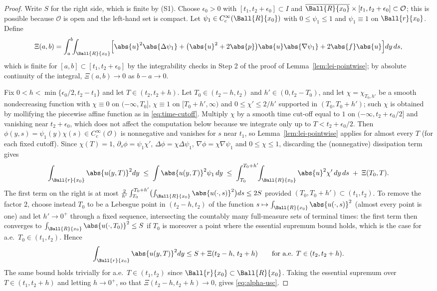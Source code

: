 \documentclass[11pt,reqno]{amsart}
\begin{document}
\begin{proof}
Write $S$ for the right side, which is finite by (S1). Choose
$\epsilon_{0}>0$ with $[t_{1},t_{2}+\epsilon_{0}]\subset I$ and
$\overline{\Ball{R}{x_{0}}}\times[t_{1},t_{2}+\epsilon_{0}]\subset\mathcal{O}$;
this is possible because $\mathcal{O}$ is open and the left-hand set is compact.
Let $\psi_{1}\in C_{c}^{\infty}(\Ball{R}{x_{0}})$ with $0\le\psi_{1}\le1$ and
$\psi_{1}\equiv1$ on $\Ball{r}{x_{0}}$. Define
\[
  \Xi(a,b)=\int_{a}^{b}\!\!\int_{\Ball{R}{x_{0}}}
   \Bigl[\abs{u}^{2}\abs{\Delta\psi_{1}}
    +\bigl(\abs{u}^{2}+2\abs{p}\bigr)\abs{u}\abs{\nabla\psi_{1}}
    +2\abs{f}\abs{u}\Bigr]dy\,ds ,
\]
which is finite for $[a,b]\subset[t_{1},t_{2}+\epsilon_{0}]$ by the
integrability checks in Step 2 of the proof of Lemma~\ref{lem:lei-pointwise};
by absolute continuity of the integral, $\Xi(a,b)\to0$ as $b-a\to0$.

Fix $0<h<\min\{\epsilon_{0}/2,t_2-t_1\}$ and let $T\in(t_{2},t_{2}+h)$. Let
$T_{0}\in(t_{2}-h,t_{2})$ and $h'\in(0,t_{2}-T_{0})$, and let
$\chi=\chi_{T_{0},h'}$ be a smooth nondecreasing function with $\chi\equiv0$ on
$(-\infty,T_{0}]$, $\chi\equiv1$ on $[T_{0}+h',\infty)$ and
$0\le\chi'\le2/h'$ supported in $(T_{0},T_{0}+h')$; such $\chi$ is obtained by
mollifying the piecewise affine function as in \eqref{eq:time-cutoff}. Multiply
$\chi$ by a smooth time cut-off equal to $1$ on
$(-\infty,t_{2}+\epsilon_{0}/2]$ and vanishing near $t_{2}+\epsilon_{0}$, which
does not affect the computation below because we integrate only up to
$T<t_{2}+\epsilon_{0}/2$. Then
$\phi(y,s)=\psi_{1}(y)\chi(s)\in C_{c}^{\infty}(\mathcal{O})$ is nonnegative and
vanishes for $s$ near $t_{1}$, so Lemma~\ref{lem:lei-pointwise} applies for almost every
$T$ (for each fixed cutoff). Since $\chi(T)=1$, $\partial_{s}\phi=\psi_{1}\chi'$,
$\Delta\phi=\chi\Delta\psi_{1}$, $\nabla\phi=\chi\nabla\psi_{1}$ and
$0\le\chi\le1$, discarding the (nonnegative) dissipation term gives
\[
  \int_{\Ball{r}{x_{0}}}\abs{u(y,T)}^{2}dy
  \;\le\;\int\abs{u(y,T)}^{2}\psi_{1}\,dy
  \;\le\;\int_{T_{0}}^{T_{0}+h'}\!\!\int_{\Ball{R}{x_{0}}}\abs{u}^{2}\chi'\,dy\,ds
   \;+\;\Xi(T_{0},T).
\]
The first term on the right is at most
$\frac{2}{h'}\int_{T_{0}}^{T_{0}+h'}\bigl(\int_{\Ball{R}{x_{0}}}\abs{u(\cdot,s)}^{2}\bigr)ds
 \le2S$ provided $(T_{0},T_{0}+h')\subset(t_{1},t_{2})$. To remove the factor
$2$, choose instead $T_{0}$ to be a Lebesgue point in $(t_{2}-h,t_{2})$ of the
function $s\mapsto\int_{\Ball{R}{x_{0}}}\abs{u(\cdot,s)}^{2}$ (almost every
point is one) and let $h'\to0^{+}$ through a fixed sequence, intersecting the countably
many full-measure sets of terminal times: the first term then converges to
$\int_{\Ball{R}{x_{0}}}\abs{u(\cdot,T_{0})}^{2}\le S$ if $T_{0}$ is moreover a
point where the essential supremum bound holds, which is the case for a.e.\
$T_{0}\in(t_{1},t_{2})$. Hence
\[
  \int_{\Ball{r}{x_{0}}}\abs{u(y,T)}^{2}dy\le S+\Xi(t_{2}-h,\,t_{2}+h)
  \qquad\text{for a.e. }T\in(t_{2},t_{2}+h).
\]
The same bound holds trivially for a.e.\ $T\in(t_{1},t_{2})$ since
$\Ball{r}{x_{0}}\subset\Ball{R}{x_{0}}$. Taking the essential supremum over
$T\in(t_{1},t_{2}+h)$ and letting $h\to0^{+}$, so that
$\Xi(t_{2}-h,t_{2}+h)\to0$, gives \eqref{eq:alpha-usc}.
\end{proof}
\end{document}
